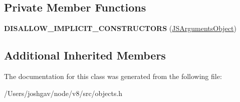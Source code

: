 \subsection*{Private Member Functions}
\begin{DoxyCompactItemize}
\item 
{\bfseries D\+I\+S\+A\+L\+L\+O\+W\+\_\+\+I\+M\+P\+L\+I\+C\+I\+T\+\_\+\+C\+O\+N\+S\+T\+R\+U\+C\+T\+O\+RS} (\hyperlink{classv8_1_1internal_1_1_j_s_arguments_object}{J\+S\+Arguments\+Object})\hypertarget{classv8_1_1internal_1_1_j_s_arguments_object_a1573be9fbd7d1bb94adde938879b8160}{}\label{classv8_1_1internal_1_1_j_s_arguments_object_a1573be9fbd7d1bb94adde938879b8160}

\end{DoxyCompactItemize}
\subsection*{Additional Inherited Members}


The documentation for this class was generated from the following file\+:\begin{DoxyCompactItemize}
\item 
/\+Users/joshgav/node/v8/src/objects.\+h\end{DoxyCompactItemize}

